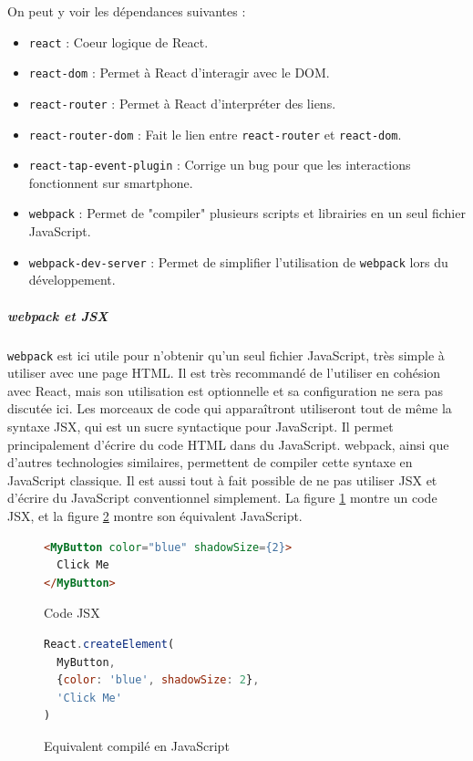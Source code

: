 			On peut y voir les dépendances suivantes :

			\begin{itemize}
				\item \texttt{react} : Coeur logique de React.
				\item \texttt{react-dom} : Permet à React d'interagir avec le DOM.
				\item \texttt{react-router} : Permet à React d'interpréter des liens.
				\item \texttt{react-router-dom} : Fait le lien entre \texttt{react-router} et \texttt{react-dom}.
				\item \texttt{react-tap-event-plugin} : Corrige un bug pour que les interactions fonctionnent sur smartphone.
				\item \texttt{webpack} : Permet de "compiler" plusieurs scripts et librairies en un seul fichier JavaScript.
				\item \texttt{webpack-dev-server} : Permet de simplifier l'utilisation de \texttt{webpack} lors du développement.
			\end{itemize}

			\subparagraph{webpack et JSX}

			\texttt{webpack}\cite{webpack} est ici utile pour n'obtenir qu'un seul fichier JavaScript, très simple à utiliser avec une page HTML. Il est très recommandé de l'utiliser en cohésion avec React, mais son utilisation est optionnelle et sa configuration ne sera pas discutée ici. Les morceaux de code qui apparaîtront utiliseront tout de même la syntaxe JSX\cite{jsx}, qui est un sucre syntactique pour JavaScript. Il permet principalement d'écrire du code HTML dans du JavaScript. webpack, ainsi que d'autres technologies similaires, permettent de compiler cette syntaxe en JavaScript classique. Il est aussi tout à fait possible de ne pas utiliser JSX et d'écrire du JavaScript conventionnel simplement. La figure \ref{analyse_code_jsx} montre un code JSX, et la figure \ref{analyse_code_js} montre son équivalent JavaScript.

			\begin{figure}[!h]
				\begin{lstlisting}[language=html]
<MyButton color="blue" shadowSize={2}>
  Click Me
</MyButton> \end{lstlisting}
				\caption{Code JSX}
				\label{analyse_code_jsx}
			\end{figure}

			\begin{figure}[!h]
				\begin{lstlisting}[language=JavaScript]
React.createElement(
  MyButton,
  {color: 'blue', shadowSize: 2},
  'Click Me'
) \end{lstlisting}
				\caption{Equivalent compilé en JavaScript}
				\label{analyse_code_js}
			\end{figure}

